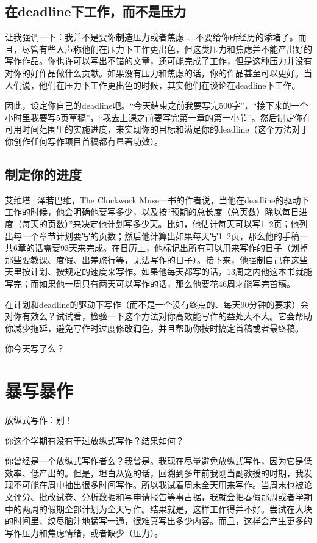 \documentclass[12pt]{ctexart}
\begin{document}
\subsection{在deadline下工作，而不是压力}

让我强调一下：我并不是要你制造压力或者焦虑……不要给你所经历的添堵了。而且，尽管有些人声称他们在压力下工作更出色，但这类压力和焦虑并不能产出好的写作作品。你也许可以写出不错的文章，还可能完成了工作，但是这种压力并没有对你的好作品做什么贡献。如果没有压力和焦虑的话，你的作品甚至可以更好。当人们说，他们在压力下工作更出色的时候，其实他们在谈论在deadline下工作。

因此，设定你自己的deadline吧。“今天结束之前我要写完500字”，“接下来的一个小时里我要写5页草稿”，“我去上课之前要写完第一章的第一小节”。然后制定你在可用时间范围里的实施进度，来实现你的目标和满足你的deadline（这个方法对于你创作任何写作项目首稿都有显著功效）。

\subsection{制定你的进度}

艾维塔·泽若巴维，The Clockwork Muse一书的作者说，当他在deadline的驱动下工作的时候，他会明确他要写多少，以及按“预期的总长度（总页数）除以每日进度（每天的页数）”来决定他计划写多少天。比如，他估计每天可以写1~2页；他列出每一个章节计划要写的页数；然后他计算出如果每天写1~2页，那么他的手稿一共6章的话需要93天来完成。在日历上，他标记出所有可以用来写作的日子（划掉那些要教课、度假、出差旅行等，无法写作的日子）。接下来，他强制自己在这些天里按计划、按规定的速度来写作。如果他每天都写的话，13周之内他这本书就能写完；而如果他一周只有两天可以写作的话，那么他要花46周才能写完首稿。

在计划和deadline的驱动下写作（而不是一个没有终点的、每天90分钟的要求）会对你有效么？试试看，检验一下这个方法对你高效能写作的益处大不大。它会帮助你减少拖延，避免写作时过度修改润色，并且帮助你按时搞定首稿或者最终稿。

你今天写了么？

\section{暴写暴作}
放纵式写作：别！

你这个学期有没有干过放纵式写作？结果如何？

你曾经是一个放纵式写作者么？我曾是。我现在尽量避免放纵式写作，因为它是低效率、低产出的。但是，坦白从宽的话，回溯到多年前我刚当副教授的时期，我发现不可能在周中抽出很多时间写作。所以我试着周末全天用来写作。当周末也被论文评分、批改试卷、分析数据和写申请报告等事占据，我就会把春假那周或者学期中的两周的假期全部计划为全天写作。结果就是，这样工作得并不好。尝试在大块的时间里、绞尽脑汁地猛写一通，很难真写出多少内容。而且，这样会产生更多的写作压力和焦虑情绪，或者缺少（压力）。
\end{document}
